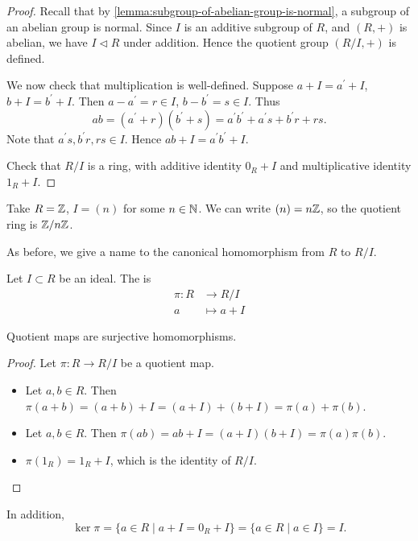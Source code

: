 \begin{proof}
Recall that by \ref{lemma:subgroup-of-abelian-group-is-normal}, a subgroup of an abelian group is normal. Since $I$ is an additive subgroup of $R$, and $(R,+)$ is abelian, we have $I\triangleleft R$ under addition. Hence the quotient group $(R/I,+)$ is defined.

We now check that multiplication is well-defined. Suppose $a+I=a^\prime+I$, $b+I=b^\prime+I$. Then $a-a^\prime=r\in I$, $b-b^\prime=s\in I$. Thus 
\[ab=(a^\prime+r)(b^\prime+s)=a^\prime b^\prime+a^\prime s+b^\prime r+rs.\]
Note that $a^\prime s,b^\prime r,rs\in I$. Hence $ab+I=a^\prime b^\prime+I$.

Check that $R/I$ is a ring, with additive identity $0_R+I$ and multiplicative identity $1_R+I$.
\end{proof}

\begin{example}
Take $R=\mathbb Z$, $I=(n)$ for some $n\in\mathbb N$. We can write $(n)=n\mathbb Z$, so the quotient ring is $\mathbb Z/n\mathbb Z$.
\end{example}

As before, we give a name to the canonical homomorphism from $R$ to $R/I$.

\begin{definition}
Let $I\subset R$ be an ideal. The  is
\begin{align*}
\pi\colon R&\to R/I\\
a&\mapsto a+I
\end{align*}
\end{definition}

\begin{lemma}
Quotient maps are surjective homomorphisms.
\end{lemma}

\begin{proof}
Let $\pi\colon R\to R/I$ be a quotient map.
\begin{itemize}
\item Let $a,b\in R$. Then $\pi(a+b)=(a+b)+I=(a+I)+(b+I)=\pi(a)+\pi(b)$.
\item Let $a,b\in R$. Then $\pi(ab)=ab+I=(a+I)(b+I)=\pi(a)\pi(b)$.
\item $\pi(1_R)=1_R+I$, which is the identity of $R/I$.
\end{itemize}
\end{proof}

In addition,
\[\ker\pi=\{a\in R\mid a+I=0_R+I\}=\{a\in R\mid a\in I\}=I.\]

